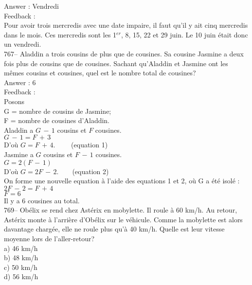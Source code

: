 \documentclass[letterpaper, 12pt]{article}
\begin{document}
Answer : Vendredi\\

Feedback : \\
Pour avoir trois mercredis avec une date impaire, il faut qu'il y ait cinq
mercredis dans le mois.  Ces mercredis sont les 1$^{er}$, 8, 15, 22 et 29
juin.  Le 10 juin \'etait donc un vendredi.  \\


767-- Aladdin a trois cousins de plus que de cousines.  Sa cousine Jasmine a
deux fois plus de cousins que de cousines.  Sachant qu'Aladdin et Jasmine
ont les m\^emes cousins et cousines, quel est le nombre total de cousines?\\

Answer : 6 \\

Feedback : \\
Posons\\
G = nombre de cousins de Jasmine;\\
F = nombre de cousines d'Aladdin.\\

Aladdin a $G\,-\,1$ cousins et $F$ cousines.\\
$G\,-\,1=F\,+\,3$\\
D'o\`u $G=F\,+\,4. \qquad$ (equation 1)\\

Jasmine a $G$ cousins et $F\,-\,1$ cousines.  \\
$G=2\left( F\,-\,1\right)  $\\
D'o\`u $G=2F\,-\,2. \qquad $(equation 2) \\

On forme une nouvelle equation \`a l'aide des equations 1 et 2, o\`u G a
\'et\'e isol\'e :\\
$2F\,-\,2=F\,+\,4$\\
$F=6$\\
Il y a 6 cousines au total.\\



769-- Ob\'elix se rend chez Ast\'erix en mobylette.  Il roule \`a 60 km/h.
Au retour, Ast\'erix monte \`a l'arri\`ere d'Ob\'elix sur le v\'ehicule.
Comme la mobylette est alors davantage charg\'ee, elle ne roule plus qu'\`a
40 km/h.  Quelle est leur vitesse moyenne lors de l'aller-retour?\\
a) 46 km/h\\
b) 48 km/h\\
c) 50 km/h\\
d) 56 km/h\\
\end{document}
